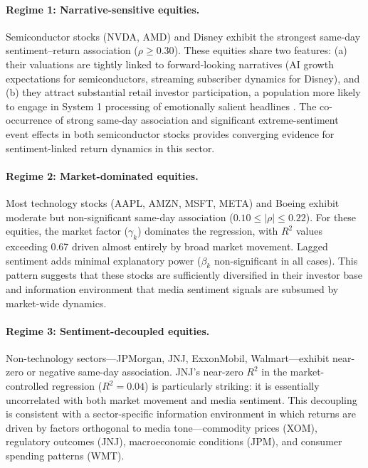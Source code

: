 \documentclass[lettersize,journal]{IEEEtran}
\begin{document}
\paragraph{Regime 1: Narrative-sensitive equities.}
Semiconductor stocks (NVDA, AMD) and Disney exhibit the strongest same-day sentiment--return association ($\rho \geq 0.30$). These equities share two features: (a) their valuations are tightly linked to forward-looking narratives (AI growth expectations for semiconductors, streaming subscriber dynamics for Disney), and (b) they attract substantial retail investor participation, a population more likely to engage in System 1 processing of emotionally salient headlines \cite{kahneman2011thinking, barber2008all}. The co-occurrence of strong same-day association and significant extreme-sentiment event effects in both semiconductor stocks provides converging evidence for sentiment-linked return dynamics in this sector.

\paragraph{Regime 2: Market-dominated equities.}
Most technology stocks (AAPL, AMZN, MSFT, META) and Boeing exhibit moderate but non-significant same-day association ($0.10 \leq |\rho| \leq 0.22$). For these equities, the market factor ($\gamma_k$) dominates the regression, with $R^2$ values exceeding 0.67 driven almost entirely by broad market movement. Lagged sentiment adds minimal explanatory power ($\beta_k$ non-significant in all cases). This pattern suggests that these stocks are sufficiently diversified in their investor base and information environment that media sentiment signals are subsumed by market-wide dynamics.

\paragraph{Regime 3: Sentiment-decoupled equities.}
Non-technology sectors---JPMorgan, JNJ, ExxonMobil, Walmart---exhibit near-zero or negative same-day association. JNJ's near-zero $R^2$ in the market-controlled regression ($R^2 = 0.04$) is particularly striking: it is essentially uncorrelated with both market movement and media sentiment. This decoupling is consistent with a sector-specific information environment in which returns are driven by factors orthogonal to media tone---commodity prices (XOM), regulatory outcomes (JNJ), macroeconomic conditions (JPM), and consumer spending patterns (WMT).
\end{document}
